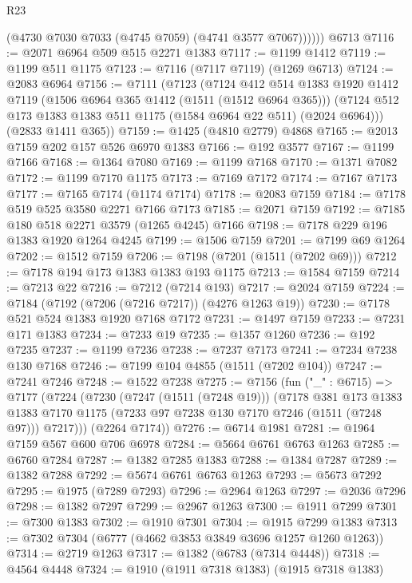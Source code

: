 \begin{lexlean}{R23}
\begin{coremodule}
            (@4730 @7030 @7033 (@4745 @7059) (@4741 @3577 @7067))))))
    @6713
@7116 := @2071 @6964 @509 @515 @2271 @1383
@7117 := @1199 @1412
@7119 := @1199 @511 @1175
@7123 := @7116 (@7117 @7119) (@1269 @6713)
@7124 := @2083 @6964
@7156 := @7111
    (@7123
      (@7124
        @412
        @514
        @1383
        @1920
        @1412
        @7119
        (@1506 @6964 @365 @1412 (@1511 (@1512 @6964 @365)))
        (@7124 @512 @173 @1383 @1383 @511 @1175 (@1584 @6964 @22 @511) (@2024 @6964)))
      (@2833 @1411 @365))
@7159 := @1425 (@4810 @2779) @4868
@7165 := @2013 @7159 @202 @157 @526 @6970 @1383
@7166 := @192 @3577
@7167 := @1199 @7166
@7168 := @1364 @7080
@7169 := @1199 @7168
@7170 := @1371 @7082
@7172 := @1199 @7170 @1175
@7173 := @7169 @7172
@7174 := @7167 @7173
@7177 := @7165 @7174 (@1174 @7174)
@7178 := @2083 @7159
@7184 := @7178 @519 @525 @3580 @2271 @7166 @7173
@7185 := @2071 @7159
@7192 := @7185 @180 @518 @2271 @3579 (@1265 @4245) @7166
@7198 := @7178 @229 @196 @1383 @1920 @1264 @4245
@7199 := @1506 @7159
@7201 := @7199 @69 @1264
@7202 := @1512 @7159
@7206 := @7198 (@7201 (@1511 (@7202 @69)))
@7212 := @7178 @194 @173 @1383 @1383 @193 @1175
@7213 := @1584 @7159
@7214 := @7213 @22
@7216 := @7212 (@7214 @193)
@7217 := @2024 @7159
@7224 := @7184 (@7192 (@7206 (@7216 @7217)) (@4276 @1263 @19))
@7230 := @7178 @521 @524 @1383 @1920 @7168 @7172
@7231 := @1497 @7159
@7233 := @7231 @171 @1383
@7234 := @7233 @19
@7235 := @1357 @1260
@7236 := @192 @7235
@7237 := @1199 @7236
@7238 := @7237 @7173
@7241 := @7234 @7238 @130 @7168
@7246 := @7199 @104 @4855 (@1511 (@7202 @104))
@7247 := @7241 @7246
@7248 := @1522 @7238
@7275 := @7156
    (fun ("_" : @6715) =>
    @7177
      (@7224
        (@7230
          (@7247 (@1511 (@7248 @19)))
          (@7178
            @381
            @173
            @1383
            @1383
            @7170
            @1175
            (@7233 @97 @7238 @130 @7170 @7246 (@1511 (@7248 @97)))
            @7217)))
      (@2264 @7174))
@7276 := @6714 @1981
@7281 := @1964 @7159 @567 @600 @706 @6978
@7284 := @5664 @6761 @6763 @1263
@7285 := @6760 @7284
@7287 := @1382 @7285 @1383
@7288 := @1384 @7287
@7289 := @1382 @7288
@7292 := @5674 @6761 @6763 @1263
@7293 := @5673 @7292
@7295 := @1975 (@7289 @7293)
@7296 := @2964 @1263
@7297 := @2036 @7296
@7298 := @1382 @7297
@7299 := @2967 @1263
@7300 := @1911 @7299
@7301 := @7300 @1383
@7302 := @1910 @7301
@7304 := @1915 @7299 @1383
@7313 := @7302 @7304 (@6777 (@4662 @3853 @3849 @3696 @1257 @1260 @1263))
@7314 := @2719 @1263
@7317 := @1382 (@6783 (@7314 @4448))
@7318 := @4564 @4448
@7324 := @1910 (@1911 @7318 @1383) (@1915 @7318 @1383)

\end{coremodule}
\end{lexlean}
